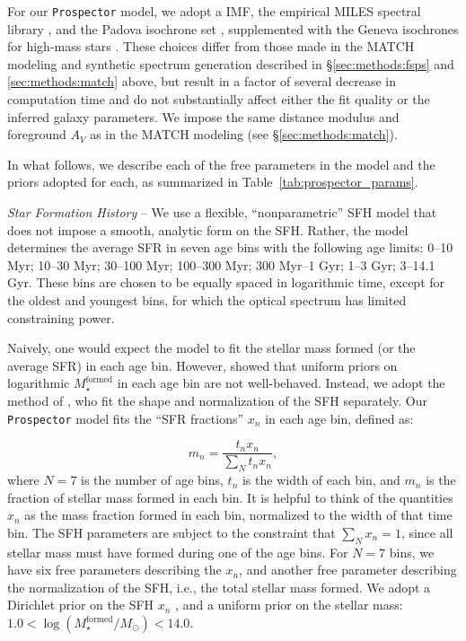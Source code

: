 \documentclass[preprint2]{aastex62}
\begin{document}
For our \texttt{Prospector} model, we adopt a \citet{kroupa01} IMF, the empirical MILES spectral library \citep{sanchez-blazquez06}, and the Padova isochrone set \citep{girardi00, marigo08}, supplemented with the Geneva isochrones for high-mass stars \citep{schaller92, meynet00}. These choices differ from those made in the MATCH modeling and synthetic spectrum generation described in \S\ref{sec:methods:fsps} and \ref{sec:methods:match} above, but result in a factor of several decrease in computation time and do not substantially affect either the fit quality or the inferred galaxy parameters. We impose the same distance modulus and foreground $A_V$ as in the MATCH modeling (see \S\ref{sec:methods:match}). 

In what follows, we describe each of the free parameters in the model and the priors adopted for each, as summarized in Table~\ref{tab:prospector_params}.

\textit{Star Formation History} --  We use a flexible, ``nonparametric'' SFH model that does not impose a smooth, analytic form on the SFH. Rather, the model determines the average SFR in seven age bins with the following age limits: 0--10 Myr; 10--30 Myr; 30--100 Myr; 100--300 Myr; 300 Myr--1 Gyr; 1--3 Gyr; 3--14.1 Gyr. These bins are chosen to be equally spaced in logarithmic time, except for the oldest and youngest bins, for which the optical spectrum has limited constraining power.

Naively, one would expect the model to fit the stellar mass formed (or the average SFR) in each age bin. However, \citet{leja18} showed that uniform priors on logarithmic $M_\star^\mathrm{formed}$ in each age bin are not well-behaved. Instead, we adopt the method of \citet{leja17}, who fit the shape and normalization of the SFH separately. Our \texttt{Prospector} model fits the ``SFR fractions'' $x_n$ in each age bin, defined as:

\begin{equation}
m_n = \frac{t_n x_n}{\sum_N t_n x_n},
\end{equation}
where $N=7$ is the number of age bins, $t_n$ is the width of each bin, and $m_n$ is the fraction of stellar mass formed in each bin. It is helpful to think of the quantities $x_n$ as the mass fraction formed in each bin, normalized to the width of that time bin. The SFH parameters are subject to the constraint that $\sum_N x_n = 1$, since all stellar mass must have formed during one of the age bins. For $N=7$ bins, we have six free parameters describing the $x_n$, and another free parameter describing the normalization of the SFH, i.e., the total stellar mass formed. We adopt a Dirichlet prior on the SFH $x_n$ \citep[see][for details]{leja17, leja18}, and a uniform prior on the stellar mass: $1.0 < \log{(M_\star^\mathrm{formed}/M_\odot)} < 14.0$.
\end{document}
